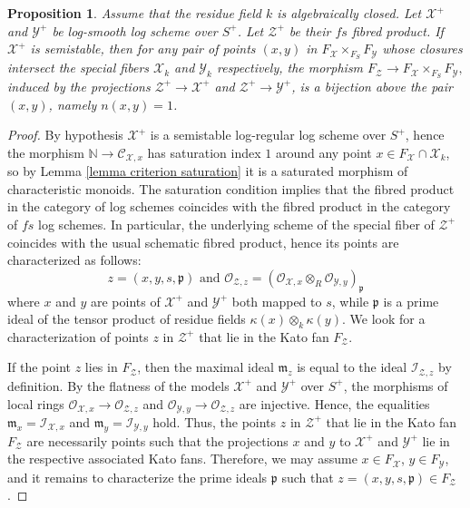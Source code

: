 \documentclass{amsart}%
\numberwithin{equation}{subsection}
\theoremstyle{plain2}
\newtheorem{prop}[equation]{Proposition}
\theoremstyle{definition2}
\theoremstyle{stepstyle}
\theoremstyle{point}
\theoremstyle{subpoint}
\newcommand{\N}{\ensuremath{\mathbb{N}}}
\newcommand{\cX}{\ensuremath{\mathscr{X}}}
\newcommand{\fp}{\ensuremath{\mathfrak{p}}}
\newcommand{\caC}{\ensuremath{\mathcal{C}}}
\newcommand{\caO}{\ensuremath{\mathcal{O}}}
\newcommand{\caI}{\ensuremath{\mathcal{I}}}
\newcommand{\cY}{\ensuremath{\mathscr{Y}}}
\newcommand{\cZ}{\ensuremath{\mathscr{Z}}}
\renewcommand{\cY}{\ensuremath{\mathscr{Y}}}
\begin{document}
\begin{prop} \label{prop semistability and iso Kato fans}
Assume that the residue field $k$ is algebraically closed. Let $\cX^+$ and $\cY^+$ be log-smooth log scheme over $S^+$. Let $\cZ^+$ be their $fs$ fibred product. If $\cX^+$ is semistable, then for any pair of points $(x,y)$ in $F_\cX \times_{F_S} F_\cY$ whose closures intersect the special fibers $\cX_k$ and $\cY_k$ respectively, the morphism $F_{\cZ}\xrightarrow{} F_{\cX} \times_{F_S} F_{\cY},$ induced by the projections $\cZ^+ \rightarrow \cX^+$ and $\cZ^+ \rightarrow \cY^+$, is a bijection above the pair $(x,y)$, namely $n(x,y)=1$.
\end{prop}

\begin{proof}
By hypothesis $\cX^+$ is a semistable log-regular log scheme over $S^+$, hence the morphism $\N \rightarrow \caC_{\cX,x}$ has saturation index $1$ around any point $x \in F_\cX \cap \cX_k$, so by Lemma \ref{lemma criterion saturation} it is a saturated morphism of characteristic monoids. The saturation condition implies that the fibred product in the category of log schemes coincides with the fibred product in the category of $fs$ log schemes. In particular, the underlying scheme of the special fiber of $\cZ^+$ coincides with the usual schematic fibred product, hence its points are characterized as follows:$$z=(x,y,s,\fp) \text{ and } \caO_{\cZ,z}=(\caO_{\cX,x} \otimes_R \caO_{\cY,y})_{\fp}$$ where $x$ and $y$ are points of $\cX^+$ and $\cY^+$ both mapped to $s$, while $\fp$ is a prime ideal of the tensor product of residue fields $\kappa(x) \otimes_{k} \kappa(y)$. We look for a characterization of points $z$ in $\cZ^+$ that lie in the Kato fan $F_{\cZ}$.

If the point $z$ lies in $F_{\cZ}$, then the maximal ideal $\mathfrak{m}_z$ is equal to the ideal $\caI_{\cZ,z}$ by definition. By the flatness of the models $\cX^+$ and $\cY^+$ over $S^+$, the morphisms of local rings $\caO_{\cX,x} \rightarrow \caO_{\cZ,z}$ and $\caO_{\cY,y} \rightarrow \caO_{\cZ,z}$ are injective. Hence, the equalities $\mathfrak{m}_x= \caI_{\cX,x}$ and $\mathfrak{m}_y= \caI_{\cY,y}$ hold. Thus, the points $z$ in $\cZ^+$ that lie in the Kato fan $F_{\cZ}$ are necessarily points such that the projections $x$ and $y$ to $\cX^+$ and $\cY^+$ lie in the respective associated Kato fans. Therefore, we may assume $x \in F_{\cX}$, $y \in F_{\cY}$, and it remains to characterize the prime ideals $\fp$ such that $z=(x,y,s,\fp) \in F_{\cZ}$.


\end{proof}
\end{document}
